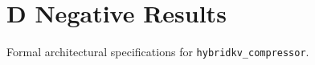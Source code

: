 \section{D Negative Results}

Formal architectural specifications for \texttt{hybridkv_compressor}.
